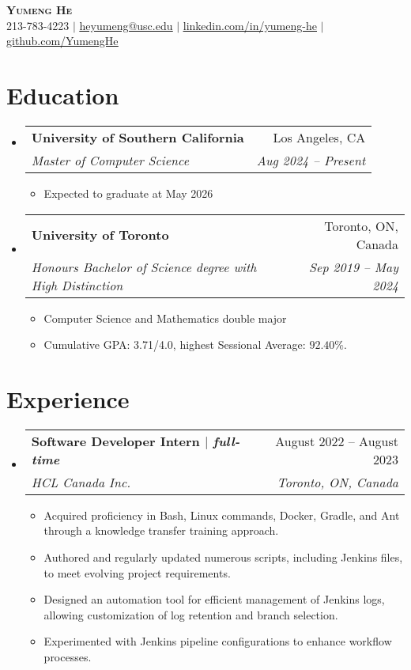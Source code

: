 \documentclass[letterpaper,11pt]{article}
\makeatletter
\newcommand{\resumeItem}[1]{
  \item\small{
    {#1 \vspace{-2pt}}
  }
}
\newcommand{\resumeSubheading}[4]{
  \vspace{-2pt}\item
    \begin{tabular*}{0.97\textwidth}[t]{l@{\extracolsep{\fill}}r}
      \textbf{#1} & #2 \\
      \textit{\small#3} & \textit{\small #4} \\
    \end{tabular*}\vspace{-7pt}
}
\newcommand{\resumeSubHeadingListStart}{\begin{itemize}[leftmargin=0.15in, label={}]}
\newcommand{\resumeSubHeadingListEnd}{\end{itemize}}
\newcommand{\resumeItemListStart}{\begin{itemize}}
\newcommand{\resumeItemListEnd}{\end{itemize}\vspace{-5pt}}
\makeatother
\begin{document}

\begin{center}
    \textbf{\Huge \scshape Yumeng He} \\ \vspace{1pt}
    \small 213-783-4223 $|$ \href{mailto:heyumeng@usc.edu}{\underline{heyumeng@usc.edu}} $|$ 
    \href{https://www.linkedin.com/in/yumeng-he}{\underline{linkedin.com/in/yumeng-he}} $|$
    \href{https://github.com/YumengHe}{\underline{github.com/YumengHe}}
\end{center}


\section{Education}
  \resumeSubHeadingListStart
    \resumeSubheading
      {University of Southern California}{Los Angeles, CA}
      {Master of Computer Science}{Aug 2024 -- Present}
      \resumeItemListStart
        \resumeItem{Expected to graduate at May 2026}
      \resumeItemListEnd
    \resumeSubheading
      {University of Toronto}{Toronto, ON, Canada}
      {Honours Bachelor of Science degree with High Distinction}{Sep 2019 -- May 2024}
      \resumeItemListStart
        \resumeItem{Computer Science and Mathematics double major}
        \resumeItem{Cumulative GPA: 3.71/4.0, highest Sessional Average: $92.40\%$.}
      \resumeItemListEnd
  \resumeSubHeadingListEnd


\section{Experience}
  \resumeSubHeadingListStart

    \resumeSubheading
      {Software Developer Intern $|$ \normalfont \emph{full-time}}{August 2022 – August 2023}
      {HCL Canada Inc.}{Toronto, ON, Canada}
      \resumeItemListStart
        \resumeItem{Acquired proficiency in Bash, Linux commands, Docker, Gradle, and Ant through a knowledge transfer training approach.}
        \resumeItem{Authored and regularly updated numerous scripts, including Jenkins files, to meet evolving project requirements.}
        \resumeItem{Designed an automation tool for efficient management of Jenkins logs, allowing customization of log retention and branch selection.}
        \resumeItem{Experimented with Jenkins pipeline configurations to enhance workflow processes.}
      \resumeItemListEnd
    \resumeSubHeadingListEnd
\end{document}
